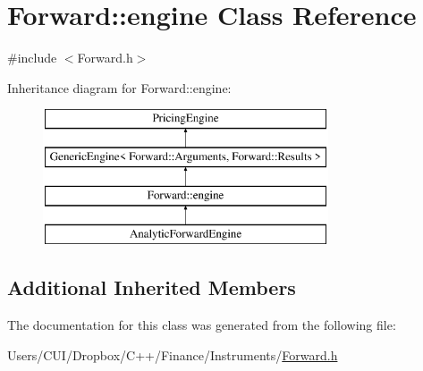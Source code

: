 \hypertarget{class_forward_1_1engine}{}\section{Forward\+:\+:engine Class Reference}
\label{class_forward_1_1engine}


{\ttfamily \#include $<$Forward.\+h$>$}

Inheritance diagram for Forward\+:\+:engine\+:\begin{figure}[H]
\begin{center}
\leavevmode
\includegraphics[height=4.000000cm]{class_forward_1_1engine}
\end{center}
\end{figure}
\subsection*{Additional Inherited Members}


The documentation for this class was generated from the following file\+:\begin{DoxyCompactItemize}
\item 
Users/\+C\+U\+I/\+Dropbox/\+C++/\+Finance/\+Instruments/\hyperlink{_forward_8h}{Forward.\+h}\end{DoxyCompactItemize}
